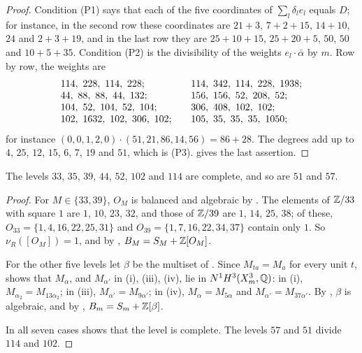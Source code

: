 \begin{proof}
Condition (P1) says that each of the five coordinates of $\sum_{l}\delta_{l}
e_{l}$ equals $D$; for instance, in the second row these coordinates are
$21+3$, $7+2+15$, $14+10$, $24$ and $2+3+19$, and in the last row they are
$25+10+15$, $25+20+5$, $50$, $50$ and $10+5+35$. Condition (P2) is the
divisibility of the weights $e_{l}\cdot\bar\alpha$ by $m$. Row by row, the
weights are
\[
\begin{array}{@{}l@{\qquad}l@{}}
  114,\ 228,\ 114,\ 228; & 114,\ 342,\ 114,\ 228,\ 1938;\\
  44,\ 88,\ 88,\ 44,\ 132; & 156,\ 156,\ 52,\ 208,\ 52;\\
  104,\ 52,\ 104,\ 52,\ 104; & 306,\ 408,\ 102,\ 102;\\
  102,\ 1632,\ 102,\ 306,\ 102; & 105,\ 35,\ 35,\ 35,\ 1050;
\end{array}
\]
for instance $(0,0,1,2,0)\cdot(51,21,86,14,56)=86+28$. The degrees add up to
$4$, $25$, $12$, $15$, $6$, $7$, $19$ and $51$, which is (P3).
 gives the last assertion.
\end{proof}

\begin{theorem}\label{thm:classes}
The levels $33$, $35$, $39$, $44$, $52$, $102$ and $114$ are complete, and so
are $51$ and $57$.
\end{theorem}

\begin{proof}
For $M\in\{33,39\}$, $O_{M}$ is balanced and algebraic by
. The elements of $\mathbb{Z}/33$ with square $1$ are $1$,
$10$, $23$, $32$, and those of $\mathbb{Z}/39$ are $1$, $14$, $25$, $38$; of these,
$O_{33}=\{1,4,16,22,25,31\}$ and $O_{39}=\{1,7,16,22,34,37\}$ contain only
$1$. So $\nu_{R}([O_{M}])=1$, and by , $B_{M}=S_{M}+
\mathbb{Z}[O_{M}]$.

For the other five levels let $\beta$ be the multiset of .
Since $M_{ta}=M_{a}$ for every unit $t$,  shows that
$M_{\alpha}$, and $M_{\alpha'}$ in (i), (iii), (iv), lie in
$N^{1}H^{3}(X^{3}_{m},\mathbb{Q})$: in (i), $M_{\alpha_{2}}=M_{13\alpha_{2}}$; in
(iii), $M_{\alpha'}=M_{9\alpha'}$; in (iv), $M_{\alpha}=M_{5\alpha}$ and
$M_{\alpha'}=M_{37\alpha'}$. By , $\beta$ is
algebraic, and by , $B_{m}=S_{m}+\mathbb{Z}[\beta]$.

In all seven cases  shows that the level is complete.
The levels $57$ and $51$ divide $114$ and $102$.
\end{proof}

